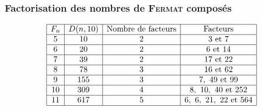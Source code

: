 \documentclass[a4paper,11pt]{article}
\theoremstyle{plain}
\theoremstyle{definition}
\theoremstyle{remark}
\newcommand{\nom}[1]{\textsc{#1}\xspace}
\newcommand{\fermat}{\nom{Fermat}}
\begin{document}
\subsubsection{Factorisation des nombres de \fermat composés}
\[
\begin{array}{|c|c|c|c|}
\hline
F_n&\text{$D(n,10)$}&\text{Nombre de facteurs}&\text{Facteurs}\\
\hline
5	&10		&2	&3\text{ et }7\\
\hline
6	&20		&2	&6\text{ et }14\\
\hline
7	&39		&2	&17\text{ et }22\\
\hline
8	&78		&3	&16\text{ et }62\\
\hline
9	&155	&3	&7,\ 49\text{ et }99\\
\hline
10	&309	&4	&8,\ 10,\ 40\text{ et }252\\
\hline
11	&617	&5	&6,\ 6,\ 21,\ 22\text{ et }564\\
\hline
\end{array}
\]
\end{document}
